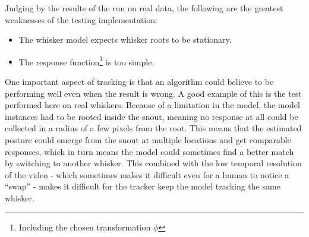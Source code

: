 Judging by the results of the run on real data, the following are the
greatest weaknesses of the testing implementation:

\begin{itemize}
\item The whisker model expects whisker roots to be stationary.
\item The response function\footnote{Including the chosen
    transformation $\phi$} is too simple.

\end{itemize}

One important aspect of tracking is that an algorithm could believe to
be performing well even when the result is wrong. A good example of
this is the test performed here on real whiskers. Because of a
limitation in the model, the model instances had to be rooted inside
the snout, meaning no response at all could be collected in a radius
of a few pixels from the root. This means that the estimated posture
could emerge from the snout at multiple locations and get comparable
responses, which in turn means the model could sometimes find a better
match by switching to another whisker. This combined with the low
temporal resolution of the video - which sometimes makes it difficult
even for a human to notice a ``swap'' - makes it difficult for the
tracker keep the model tracking the same whisker.




%
%


